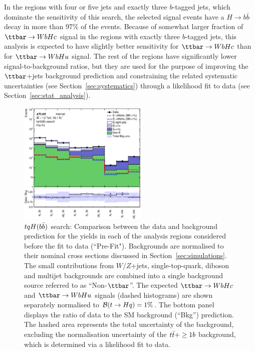 In the regions with four or five jets and exactly three $b$-tagged jets, which dominate the sensitivity of this search, 
the selected signal events have a $H \to b\bar{b}$ decay in more than 97\% of the events.
Because of somewhat larger fraction of $\Hc$ signal in the regions with exactly three $b$-tagged jets,
this analysis is expected to have slightly better sensitivity for $\Hc$ than for $\Hu$ signal.
The rest of the regions have significantly lower signal-to-background ratios, but they are used for the purpose of improving 
the $\ttbar$+jets background prediction and constraining the related systematic uncertainties (see Section~\ref{sec:systematics})
through a likelihood fit to data (see Section~\ref{sec:stat_analysis}).  

\begin{figure}[t]
\begin{center}
\includegraphics[width=0.55\textwidth]{figures/Hbb/fit/cH_plots/Summary.eps}
\caption{$tqH(b\bar{b})$ search: Comparison between the data and background prediction for the yields in each of the analysis regions considered 
before the fit to data (``Pre-Fit"). Backgrounds are normalised to their nominal cross sections discussed in Section~\ref{sec:simulations}.
The small contributions from $W/Z$+jets,  single-top-quark, diboson and multijet backgrounds are combined into a single background source 
referred to as ``Non-$\ttbar$''. 
The expected $\Hc$ and $\Hu$ signals (dashed histograms) are shown separately normalised to $\mathcal{B}(t\to Hq)=1\%$.
The bottom panel displays the ratio of data to the SM background (``Bkg'') prediction. 
The hashed area represents the total uncertainty of the background, excluding the normalisation uncertainty of the $t\bar{t}+\geq1b$ background, 
which is determined via a likelihood fit to data.} 
\label{fig:Hbb_Summary}
\end{center}
\end{figure}

